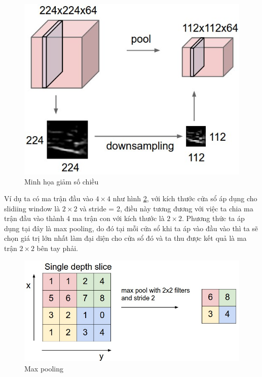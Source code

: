 \begin{center}
\begin{figure}[H]
	\begin{center}
		\includegraphics[scale=0.5]{chap3/image/cnn/poolEx.jpeg}
	\end{center}
	\caption{Minh họa giảm số chiều}
	\label{fig:pool}
\end{figure}
\end{center}
Ví dụ ta có ma trận đầu vào $4\times 4$  như hình \ref{fig:poolExample}, với kích thước cửa sổ áp dụng cho slidiing window là $2\times 2$ và stride = 2, điều này tương đương với việc ta chia ma trận đầu vào thành 4 ma trận con với kích thước là $2\times2$.  Phương thức ta áp dụng tại đây là max pooling, do đó tại mỗi cửa sổ khi ta áp vào đầu vào thì ta sẽ chọn giá trị lớn nhất làm đại diện cho cửa sổ đó và ta thu được kết quả là ma trận $2\times2$ bên tay phải.
\begin{center}
\begin{figure}[htp]
	\begin{center}
		\includegraphics[scale=0.5]{chap3/image/cnn/maxpoolEx.jpeg}
	\end{center}
	\caption{Max pooling}
	\label{fig:poolExample}
\end{figure}
\end{center}
